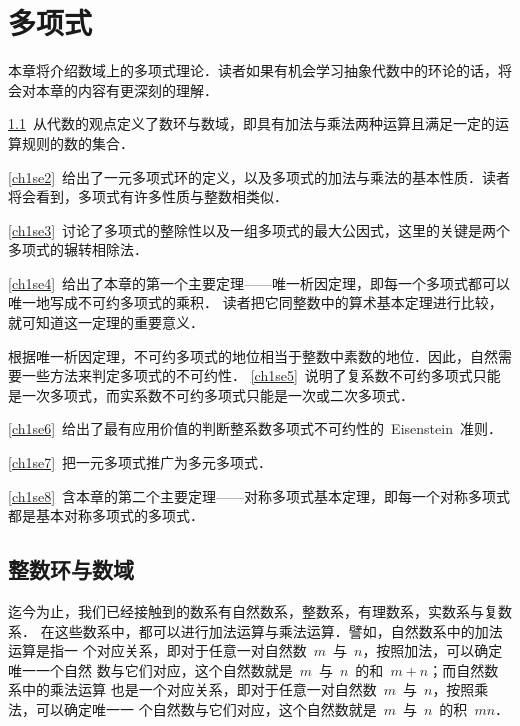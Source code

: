 ﻿%


\chapter{多\TitHspace{.5\ccwd}项\TitHspace{.5\ccwd}式}\label{ch1}


\begin{IntroPar}
\item 本章将介绍数域上的多项式理论．读者如果有机会学习抽象代数中的环论的话，将会对本章的内容有更深刻的理解．%
\item \ref{ch1se1}~从代数的观点定义了数环与数域，即具有加法与乘法两种运算且满足一定的运算规则的数的集合．%
\item \ref{ch1se2}~给出了一元多项式环的定义，以及多项式的加法与乘法的基本性质．读者将会看到，多项式有许多性质与整数相类似．%
\item \ref{ch1se3}~讨论了多项式的整除性以及一组多项式的最大公因式，这里的关键是两个多项式的辗转相除法．%
\item \ref{ch1se4}~给出了本章的第一个主要定理——唯一析因定理，即每一个多项式都可以唯一地写成不可约多项式的乘积．%
      读者把它同整数中的算术基本定理进行比较，就可知道这一定理的重要意义．%
\item 根据唯一析因定理，不可约多项式的地位相当于整数中素数的地位．因此，自然需要一些方法来判定多项式的不可约性．%
      \ref{ch1se5}~说明了复系数不可约多项式只能是一次多项式，而实系数不可约多项式只能是一次或二次多项式．%
\item \ref{ch1se6}~给出了最有应用价值的判断整系数多项式不可约性的~Eisenstein~准则．%
\item \ref{ch1se7}~把一元多项式推广为多元多项式．%
\item \ref{ch1se8}~含本章的第二个主要定理——对称多项式基本定理，即每一个对称多项式都是基本对称多项式的多项式．
\end{IntroPar}

\section{整数环与数域}\label{ch1se1}

迄今为止，我们已经接触到的数系有自然数系，整数系，有理数系，实数系与复数系．%
在这些数系中，都可以进行加法运算与乘法运算．譬如，自然数系中的加法运算是指一
个对应关系，即对于任意一对自然数~$m$~与~$n$，按照加法，可以确定唯一一个自然
数与它们对应，这个自然数就是~$m$~与~$n$~的和~$m+n$；而自然数系中的乘法运算
也是一个对应关系，即对于任意一对自然数~$m$~与~$n$，按照乘法，可以确定唯一一
个自然数与它们对应，这个自然数就是~$m$~与~$n$~的积~$mn$．%

